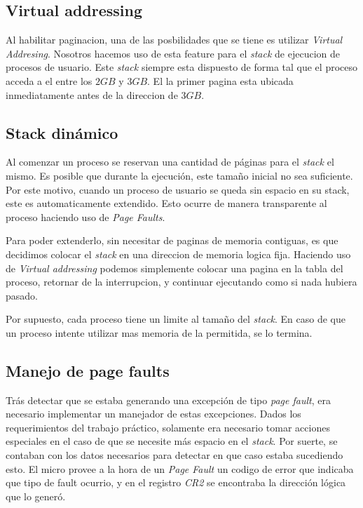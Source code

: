 \documentclass[a4paper,10pt]{article}
\begin{document}
\subsection{Virtual addressing}

Al habilitar paginacion, una de las posbilidades que se tiene es utilizar \textit{Virtual Addresing}.
Nosotros hacemos uso de esta feature para el \textit{stack} de ejecucion de procesos de usuario.
Este \textit{stack} siempre esta dispuesto de forma tal que el proceso acceda a el entre los $ 2GB $ y $ 3GB $.
El la primer pagina esta ubicada inmediatamente antes de la direccion de $ 3GB $.

\subsection{Stack dinámico}

Al comenzar un proceso se reservan una cantidad de páginas para el \textit{stack} el mismo.
Es posible que durante la ejecución, este tamaño inicial no sea suficiente.
Por este motivo, cuando un proceso de usuario se queda sin espacio en su stack, este es automaticamente extendido.
Esto ocurre de manera transparente al proceso haciendo uso de \textit{Page Faults}.

Para poder extenderlo, sin necesitar de paginas de memoria contiguas, es que decidimos colocar el \textit{stack} en una direccion de memoria logica fija.
Haciendo uso de \textit{Virtual addressing} podemos simplemente colocar una pagina en la tabla del proceso, retornar de la interrupcion, y continuar ejecutando como si nada hubiera pasado.

Por supuesto, cada proceso tiene un limite al tamaño del \textit{stack}.
En caso de que un proceso intente utilizar mas memoria de la permitida, se lo termina.

\subsection{Manejo de page faults}

Trás detectar que se estaba generando una excepción de tipo \textit{page fault}, era necesario implementar un manejador de estas excepciones.
Dados los requerimientos del trabajo práctico, solamente era necesario tomar acciones especiales en el caso de que se necesite más espacio en el \textit{stack}.
Por suerte, se contaban con los datos necesarios para detectar en que caso estaba sucediendo esto.
El micro provee a la hora de un \textit{Page Fault} un codigo de error que indicaba que tipo de fault ocurrio, y en el registro \textit{CR2} se encontraba la dirección lógica que lo generó.
\end{document}
